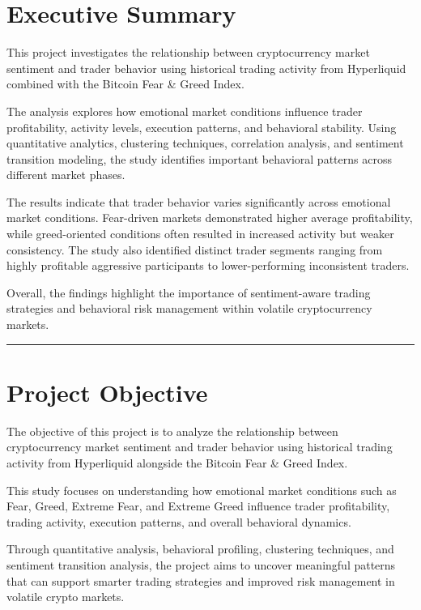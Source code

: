 \documentclass[11pt,a4paper]{article}
\begin{document}

\section{Executive Summary}

This project investigates the relationship between cryptocurrency market sentiment and trader behavior using historical trading activity from Hyperliquid combined with the Bitcoin Fear \& Greed Index.

The analysis explores how emotional market conditions influence trader profitability, activity levels, execution patterns, and behavioral stability. Using quantitative analytics, clustering techniques, correlation analysis, and sentiment transition modeling, the study identifies important behavioral patterns across different market phases.

The results indicate that trader behavior varies significantly across emotional market conditions. Fear-driven markets demonstrated higher average profitability, while greed-oriented conditions often resulted in increased activity but weaker consistency. The study also identified distinct trader segments ranging from highly profitable aggressive participants to lower-performing inconsistent traders.

Overall, the findings highlight the importance of sentiment-aware trading strategies and behavioral risk management within volatile cryptocurrency markets.

\vspace{0.5cm}
\hrule
\vspace{0.3cm}

\section{Project Objective}

The objective of this project is to analyze the relationship between cryptocurrency market sentiment and trader behavior using historical trading activity from Hyperliquid alongside the Bitcoin Fear \& Greed Index.

This study focuses on understanding how emotional market conditions such as Fear, Greed, Extreme Fear, and Extreme Greed influence trader profitability, trading activity, execution patterns, and overall behavioral dynamics.

Through quantitative analysis, behavioral profiling, clustering techniques, and sentiment transition analysis, the project aims to uncover meaningful patterns that can support smarter trading strategies and improved risk management in volatile crypto markets.
\end{document}
